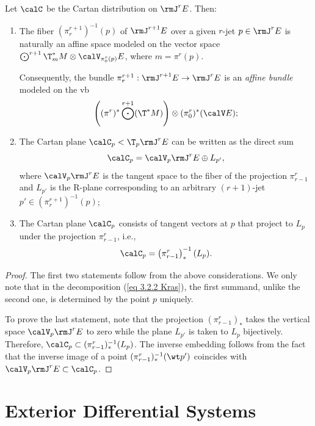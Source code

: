 \begin{thm}\label{thm 3.2.1 Kras}
    Let $\calC$ be the Cartan distribution on $\rmJ^rE$. Then:
    \begin{enumerate}
        \item The fiber $(\pi^{r+1}_{r})^{-1}(p)$ of $\rmJ^{r+1}E$ over a given $r$-jet $p\in \rmJ^rE$ is naturally an affine space modeled on the vector space $\bigodot^{r+1}\T^\ast_m M\otimes \calV_{\pi^r_0(p)}E$, where $m=\pi^r(p)$. 
        
        Consequently, the bundle $\pi^{r+1}_r:\rmJ^{r+1}E\to \rmJ^rE$ is an \emph{affine bundle} modeled on the \gls{vb} 
        \[\left((\pi^r)^\ast \bigodot^{r+1}(\T^\ast M)\right)\otimes (\pi^r_0)^\ast (\calV E);\]        
        \item The Cartan plane $\calC_p<\T_p \rmJ^rE$ can be written as the direct sum
        \[\calC_p=\calV_p\rmJ^rE\oplus L_{p'},\label{eq 3.2.2 Kras}\]
        where $\calV_p\rmJ^rE$ is the tangent space to the fiber of the projection $\pi^r_{r-1}$ and $L_{p'}$ is the R-plane corresponding to an arbitrary $(r+1)$-jet $p'\in(\pi^{r+1}_r)^{-1}(p)$;
        \item The Cartan plane $\calC_p$ consists of tangent vectors at $p$ that project to $L_p$ under the projection $\pi^r_{r-1}$, i.e.,
        \[\calC_p=\left(\pi^r_{r-1}\right)_\ast^{-1}(L_p).\]
    \end{enumerate}
\end{thm}
\begin{proof}
    The first two statements follow from the above considerations. We only note that in the decomposition (\ref{eq 3.2.2 Kras}), the first summand, unlike the second one, is determined by the point $p$ uniquely.

    To prove the last statement, note that the projection $(\pi^r_{r-1})_\ast$ takes the vertical space $\calV_p\rmJ^rE$ to zero while the plane $L_{p'}$ is taken to $L_p$ bijectively. Therefore, $\calC_p\subset (\pi^r_{r-1})^{-1}_\ast(L_p)$. The inverse embedding follows from the fact that the inverse image of a point $(\pi^r_{r-1})^{-1}_\ast(\wt p')$ coincides with $\calV_p\rmJ^rE\subset\calC_p$.
\end{proof}









\clearpage
\chapter{Exterior Differential Systems}\label{sec: PDEs}


